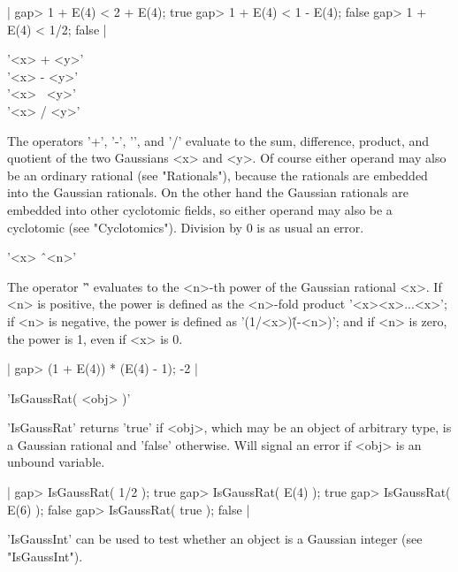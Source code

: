 |    gap> 1 + E(4) < 2 + E(4);
    true
    gap> 1 + E(4) < 1 - E(4);
    false
    gap> 1 + E(4) < 1/2;
    false |

%
%
%

'<x>  +  <y>' \\
'<x>  -  <y>' \\
'<x> \*\ <y>' \\
'<x>  /  <y>'

The  operators '+', '-', '\*', and  '/' evaluate  to the sum, difference,
product, and quotient of the two Gaussians <x> and <y>.  Of course either
operand  may also be an  ordinary rational (see "Rationals"), because the
rationals are embedded  into the Gaussian rationals.   On  the other hand
the Gaussian  rationals  are embedded  into other   cyclotomic fields, so
either operand may also be a cyclotomic (see "Cyclotomics").  Division by
0 is as usual an error.

'<x> \^\ <n>'

The operator '\^' evaluates to the  <n>-th power of the Gaussian rational
<x>.  If  <n> is positive, the power  is defined as  the <n>-fold product
'<x>\*<x>\*...<x>';   if <n> is    negative,   the power is  defined   as
'(1/<x>)\^(-<n>)'; and if <n> is zero, the power is 1, even if <x> is 0.

|    gap> (1 + E(4)) * (E(4) - 1);
    -2 |

%

'IsGaussRat( <obj> )'

'IsGaussRat' returns 'true' if <obj>, which may be an object of arbitrary
type, is a Gaussian rational and 'false' otherwise.  Will signal an error
if <obj> is an unbound variable.

|    gap> IsGaussRat( 1/2 );
    true
    gap> IsGaussRat( E(4) );
    true
    gap> IsGaussRat( E(6) );
    false
    gap> IsGaussRat( true );
    false |

'IsGaussInt' can be used to test whether an object is a  Gaussian integer
(see "IsGaussInt").

%

